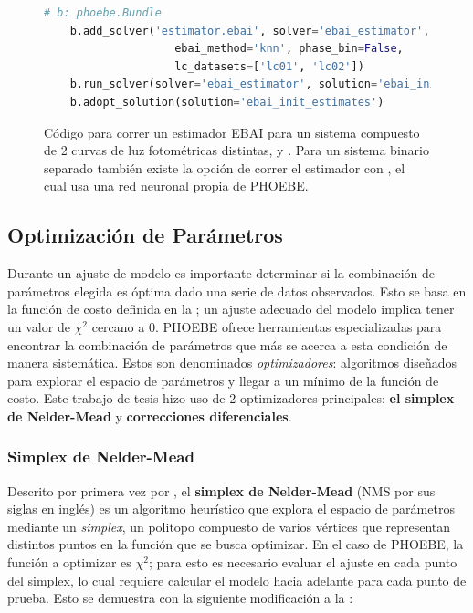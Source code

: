\begin{figure}[!ht]
	\begin{lstlisting}[language=Python, autogobble]
	# b: phoebe.Bundle
	b.add_solver('estimator.ebai', solver='ebai_estimator', 
					ebai_method='knn', phase_bin=False, 
					lc_datasets=['lc01', 'lc02'])
	b.run_solver(solver='ebai_estimator', solution='ebai_init_estimates')
	b.adopt_solution(solution='ebai_init_estimates')
	\end{lstlisting}
	\caption{Código para correr un estimador EBAI para un sistema compuesto de 2
	curvas de luz fotométricas distintas,  y . Para un
	sistema binario separado también existe la opción de correr el estimador con
	, el cual usa una red neuronal propia de PHOEBE.}
\end{figure}

\subsection{Optimización de Parámetros}

Durante un ajuste de modelo es importante determinar si la combinación de
parámetros elegida es óptima dado una serie de datos observados. Esto se basa en
la función de costo definida en la ; un ajuste
adecuado del modelo implica tener un valor de $\chi^2$ cercano a 0. PHOEBE
ofrece herramientas especializadas para encontrar la combinación de parámetros
que más se acerca a esta condición de manera sistemática. Estos son denominados
\textit{optimizadores}: algoritmos diseñados para explorar el espacio de
parámetros y llegar a un mínimo de la función de costo. Este trabajo de tesis
hizo uso de 2 optimizadores principales: \textbf{el simplex de Nelder-Mead} y
\textbf{correcciones diferenciales}.

\subsubsection{Simplex de Nelder-Mead}

Descrito por primera vez por , el
\textbf{simplex de Nelder-Mead} (NMS por sus siglas en inglés) es un algoritmo
heurístico que explora el espacio de parámetros mediante un \textit{simplex}, un
politopo compuesto de varios vértices que representan distintos puntos en la
función que se busca optimizar. En el caso de PHOEBE, la función a optimizar es
$\chi^2$; para esto es necesario evaluar el ajuste en cada punto del simplex, lo
cual requiere calcular el modelo hacia adelante para cada punto de prueba. Esto
se demuestra con la siguiente modificación a la :


